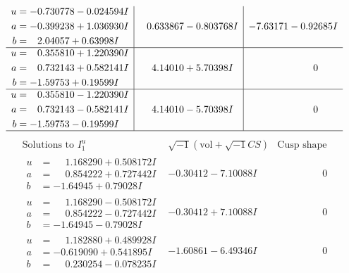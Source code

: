\documentclass[1p]{elsarticle_modified}
\theoremstyle{definition}
\newcommand{\I}{\sqrt{-1}}
\begin{document}
$$\begin{array}{c|c|c}
\begin{aligned}
u &= -0.730778 - 0.024594 I \\
a &= -0.399238 + 1.036930 I \\
b &= \phantom{-}2.04057 + 0.63998 I\end{aligned}
 & \phantom{-}0.633867 - 0.803768 I & -7.63171 - 0.92685 I \\ \hline\begin{aligned}
u &= \phantom{-}0.355810 + 1.220390 I \\
a &= \phantom{-}0.732143 + 0.582141 I \\
b &= -1.59753 + 0.19599 I\end{aligned}
 & \phantom{-}4.14010 + 5.70398 I & \phantom{-0.000000 } 0 \\ \hline\begin{aligned}
u &= \phantom{-}0.355810 - 1.220390 I \\
a &= \phantom{-}0.732143 - 0.582141 I \\
b &= -1.59753 - 0.19599 I\end{aligned}
 & \phantom{-}4.14010 - 5.70398 I & \phantom{-0.000000 } 0\\
 \hline 
 \end{array}$$\newpage$$\begin{array}{c|c|c}  
\text{Solutions to }I^u_{1}& \I (\text{vol} + \sqrt{-1}CS) & \text{Cusp shape}\\
 \hline 
\begin{aligned}
u &= \phantom{-}1.168290 + 0.508172 I \\
a &= \phantom{-}0.854222 + 0.727442 I \\
b &= -1.64945 + 0.79028 I\end{aligned}
 & -0.30412 - 7.10088 I & \phantom{-0.000000 } 0 \\ \hline\begin{aligned}
u &= \phantom{-}1.168290 - 0.508172 I \\
a &= \phantom{-}0.854222 - 0.727442 I \\
b &= -1.64945 - 0.79028 I\end{aligned}
 & -0.30412 + 7.10088 I & \phantom{-0.000000 } 0 \\ \hline\begin{aligned}
u &= \phantom{-}1.182880 + 0.489928 I \\
a &= -0.619090 + 0.541895 I \\
b &= \phantom{-}0.230254 - 0.078235 I\end{aligned}
 & -1.60861 - 6.49346 I & \phantom{-0.000000 } 0 \\ \hline\begin{aligned}

\end{aligned}
\end{array}$$
\end{document}
